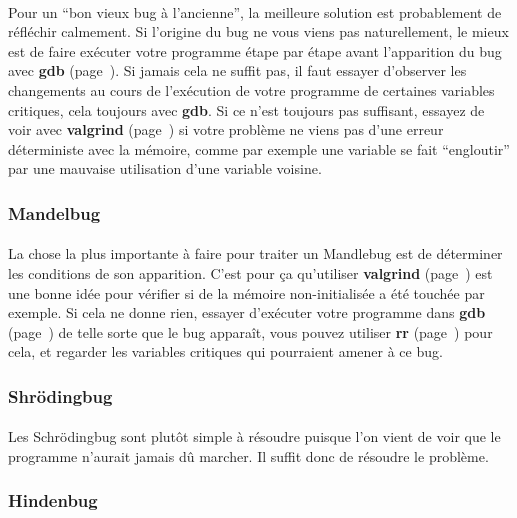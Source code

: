 \paragraph{} Pour un ``bon vieux bug à l'ancienne'', la meilleure solution est
probablement de réfléchir calmement. Si l'origine du bug ne vous viens pas
naturellement, le mieux est de faire exécuter votre programme étape par étape
avant l'apparition du bug avec \textbf{gdb} (page~\pageref{part:gdb}). Si
jamais cela ne suffit pas, il faut essayer d'observer les changements au cours
de l'exécution de votre programme de certaines variables critiques, cela
toujours avec \textbf{gdb}. Si ce n'est toujours pas suffisant, essayez de voir
avec \textbf{valgrind} (page~\pageref{part:valgrind}) si votre problème ne
viens pas d'une erreur déterministe avec la mémoire, comme par exemple une
variable se fait ``engloutir'' par une mauvaise utilisation d'une variable
voisine.

\subsubsection{Mandelbug}

\paragraph{} La chose la plus importante à faire pour traiter un Mandlebug est
de déterminer les conditions de son apparition. C'est pour ça qu'utiliser
\textbf{valgrind} (page~\pageref{part:valgrind}) est une bonne idée pour
vérifier si de la mémoire non-initialisée a été touchée par exemple. Si cela ne
donne rien, essayer d'exécuter votre programme dans \textbf{gdb}
(page~\pageref{part:gdb}) de telle sorte que le bug apparaît, vous pouvez
utiliser \textbf{rr} (page~\pageref{part:rr}) pour cela, et regarder les
variables critiques qui pourraient amener à ce bug.


\subsubsection{Shrödingbug}

\paragraph{} Les Schrödingbug sont plutôt simple à résoudre puisque l'on vient
de voir que le programme n'aurait jamais dû marcher. Il suffit donc de résoudre
le problème.


\subsubsection{Hindenbug}

